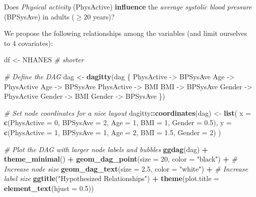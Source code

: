 \documentclass[
]{book}
\newenvironment{Shaded}{\begin{snugshade}}{\end{snugshade}}
\newcommand{\AttributeTok}[1]{\textcolor[rgb]{0.13,0.29,0.53}{#1}}
\newcommand{\CommentTok}[1]{\textcolor[rgb]{0.56,0.35,0.01}{\textit{#1}}}
\newcommand{\DecValTok}[1]{\textcolor[rgb]{0.00,0.00,0.81}{#1}}
\newcommand{\FloatTok}[1]{\textcolor[rgb]{0.00,0.00,0.81}{#1}}
\newcommand{\FunctionTok}[1]{\textcolor[rgb]{0.13,0.29,0.53}{\textbf{#1}}}
\newcommand{\NormalTok}[1]{#1}
\newcommand{\OtherTok}[1]{\textcolor[rgb]{0.56,0.35,0.01}{#1}}
\newcommand{\SpecialCharTok}[1]{\textcolor[rgb]{0.81,0.36,0.00}{\textbf{#1}}}
\newcommand{\StringTok}[1]{\textcolor[rgb]{0.31,0.60,0.02}{#1}}
\begin{document}
Does \emph{Physical activity} (PhysActive) \textbf{influence} the \emph{average systolic
blood pressure} (BPSysAve) in adults (\(\ge 20\) years)?

We propose the following relationships among the variables
(and limit ourselves to 4 covariates):

\begin{Shaded}
\begin{Highlighting}[]
\NormalTok{df }\OtherTok{\textless{}{-}}\NormalTok{ NHANES }\CommentTok{\# shorter}

\CommentTok{\# Define the DAG}
\NormalTok{dag }\OtherTok{\textless{}{-}} \FunctionTok{dagitty}\NormalTok{(}\StringTok{\textquotesingle{}dag \{}
\StringTok{  PhysActive {-}\textgreater{} BPSysAve}
\StringTok{  Age {-}\textgreater{} PhysActive}
\StringTok{  Age {-}\textgreater{} BPSysAve}
\StringTok{  PhysActive {-}\textgreater{} BMI}
\StringTok{  BMI {-}\textgreater{} BPSysAve}
\StringTok{  Gender {-}\textgreater{} PhysActive}
\StringTok{  Gender {-}\textgreater{} BMI}
\StringTok{  Gender {-}\textgreater{} BPSysAve}
\StringTok{\}\textquotesingle{}}\NormalTok{)}

\CommentTok{\# Set node coordinates for a nice layout}
\NormalTok{dagitty}\SpecialCharTok{::}\FunctionTok{coordinates}\NormalTok{(dag) }\OtherTok{\textless{}{-}} \FunctionTok{list}\NormalTok{(}
  \AttributeTok{x =} \FunctionTok{c}\NormalTok{(}\AttributeTok{PhysActive =} \DecValTok{0}\NormalTok{, }\AttributeTok{BPSysAve =} \DecValTok{2}\NormalTok{, }\AttributeTok{Age =} \DecValTok{1}\NormalTok{, }\AttributeTok{BMI =} \DecValTok{1}\NormalTok{, }\AttributeTok{Gender =} \FloatTok{0.5}\NormalTok{),}
  \AttributeTok{y =} \FunctionTok{c}\NormalTok{(}\AttributeTok{PhysActive =} \DecValTok{1}\NormalTok{, }\AttributeTok{BPSysAve =} \DecValTok{1}\NormalTok{, }\AttributeTok{Age =} \DecValTok{2}\NormalTok{, }\AttributeTok{BMI =} \FloatTok{1.5}\NormalTok{, }\AttributeTok{Gender =} \DecValTok{2}\NormalTok{)}
\NormalTok{)}

\CommentTok{\# Plot the DAG with larger node labels and bubbles}
\FunctionTok{ggdag}\NormalTok{(dag) }\SpecialCharTok{+} 
  \FunctionTok{theme\_minimal}\NormalTok{() }\SpecialCharTok{+} 
  \FunctionTok{geom\_dag\_point}\NormalTok{(}\AttributeTok{size =} \DecValTok{20}\NormalTok{, }\AttributeTok{color =} \StringTok{"black"}\NormalTok{) }\SpecialCharTok{+}  \CommentTok{\# Increase node size}
  \FunctionTok{geom\_dag\_text}\NormalTok{(}\AttributeTok{size =} \FloatTok{2.5}\NormalTok{, }\AttributeTok{color =} \StringTok{"white"}\NormalTok{) }\SpecialCharTok{+}    \CommentTok{\# Increase label size}
  \FunctionTok{ggtitle}\NormalTok{(}\StringTok{"Hypothesized Relationships"}\NormalTok{) }\SpecialCharTok{+} 
  \FunctionTok{theme}\NormalTok{(}\AttributeTok{plot.title =} \FunctionTok{element\_text}\NormalTok{(}\AttributeTok{hjust =} \FloatTok{0.5}\NormalTok{))}
\end{Highlighting}
\end{Shaded}
\end{document}
